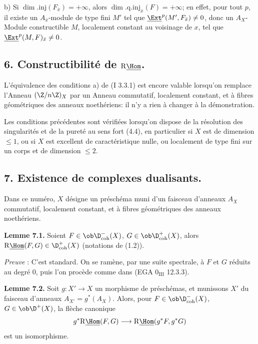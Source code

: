 b) Si $\dim.\mathrm{inj}(F_{\bar{x}})=+\infty$, alors $\dim.\mathrm{q.inj}_{\bar{x}}(F)=+\infty$; en effet, pour tout $p$, il existe un $A_{\bar{x}}$-module de type fini $M'$ tel que $\underline{\Ext}^p(M',F_{\bar{x}})\neq0$, donc un $A_X$-Module constructible $M$, localement constant au voisinage de $x$, tel que $\underline{\Ext}^p(M,F)_{\bar{x}}\neq0$.

\subsection*{6. Constructibilité de $\mathrm{R}\underline{\Hom}$.}

L'équivalence des conditions a) de (I 3.3.1) est encore valable lorsqu'on remplace l'Anneau $(\Z/n\Z)_X$ par un Anneau commutatif, localement constant, et à fibres géométriques des anneaux noethériens: il n'y a rien à changer à la démonstration.

Les conditions précédentes sont vérifiées lorsqu'on dispose de la résolution des singularités et de la pureté au sens fort (4.4), en particulier si $X$ est de dimension $\leq1$, ou si $X$ est excellent de caractéristique nulle, ou localement de type fini sur un corps et de dimension $\leq2$.

\subsection*{7. Existence de complexes dualisants.}

Dans ce numéro, $X$ désigne un préschéma muni d'un faisceau d'anneaux $A_X$ commutatif, localement constant, et à fibres géométriques des anneaux noethériens.

\textbf{Lemme 7.1.} Soient $F\in\ob\D^{-}_{\mathrm{coh}}(X)$, $G\in\ob\D^{+}_{\mathrm{coh}}(X)$, alors $\mathrm{R}\underline{\Hom}(F,G)\in\D^{+}_{\mathrm{coh}}(X)$ (notations de (1.2)).

\emph{Preuve} : C'est standard. On se ramène, par une suite spectrale, à $F$ et $G$ réduits au degré $0$, puis l'on procède comme dans (EGA $0_{\mathrm{III}}$ 12.3.3).

\textbf{Lemme 7.2.} Soit $g:X'\to X$ un morphisme de préschémas, et munissons $X'$ du faisceau d'anneaux $A_{X'}=g^*(A_X)$. Alors, pour $F\in\ob\D^{-}_{\mathrm{coh}}(X)$, $G\in\ob\D^{+}(X)$, la flèche canonique
\[
        g^*\mathrm{R}\underline{\Hom}(F,G)\longrightarrow \mathrm{R}\underline{\Hom}(g^*F,g^*G)
\]
est un isomorphisme.

